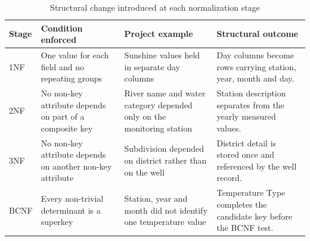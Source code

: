 \begin{table}[H]
\centering
\caption{Structural change introduced at each normalization stage}
\label{tab:normalization-summary}
\begin{tabular}{L{0.10\textwidth}L{0.25\textwidth}L{0.24\textwidth}L{0.26\textwidth}}
\toprule
Stage & Condition enforced & Project example & Structural outcome \\
\midrule
1NF & One value for each field and no repeating groups &
Sunshine values held in separate day columns &
Day columns become rows carrying station, year, month and day. \\
2NF & No non-key attribute depends on part of a composite key &
River name and water category depended only on the monitoring station &
Station description separates from the yearly measured values. \\
3NF & No non-key attribute depends on another non-key attribute &
Subdivision depended on district rather than on the well &
District detail is stored once and referenced by the well record. \\
BCNF & Every non-trivial determinant is a superkey &
Station, year and month did not identify one temperature value &
Temperature Type completes the candidate key before the BCNF test. \\
\bottomrule
\end{tabular}
\end{table}

\setlength{\abovedisplayskip}{11pt plus 3pt minus 6pt}
\setlength{\belowdisplayskip}{11pt plus 3pt minus 6pt}
\setlength{\abovedisplayshortskip}{0pt plus 3pt}
\setlength{\belowdisplayshortskip}{6.5pt plus 3.5pt minus 3pt}
\clearpage
